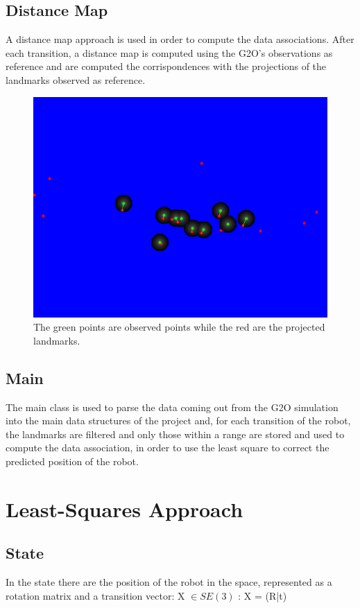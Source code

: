 \documentclass[10pt]{article}
\begin{document}
		\subsection{Distance Map}
		A distance map approach is used in order to compute the data associations.
		After each transition, a distance map is computed using the G2O's observations as reference and are computed the corrispondences with the projections of the landmarks observed as reference.

		\begin{figure}[H]
			\centering
			\includegraphics[width=0.7\linewidth]{img/corrispondences}
			\caption{The green points are observed points while the red are the projected landmarks.}
			\label{fig:corrispondences}
		\end{figure}

		\subsection{Main}
		The main class is used to parse the data coming out from the G2O simulation into the main data structures of the project and, for each transition of the robot, the landmarks are filtered and only those within a range are stored and used to compute the data association, in order to use the least square to correct the predicted position of the robot.\\
		 		
	\section{Least-Squares Approach}
	\subsection{State}
	In the state there are the position of the robot in the space, represented as a rotation matrix and a transition vector:
	X $\in \textit{SE}(3)$ : X = (R|t)
	
\end{document}
